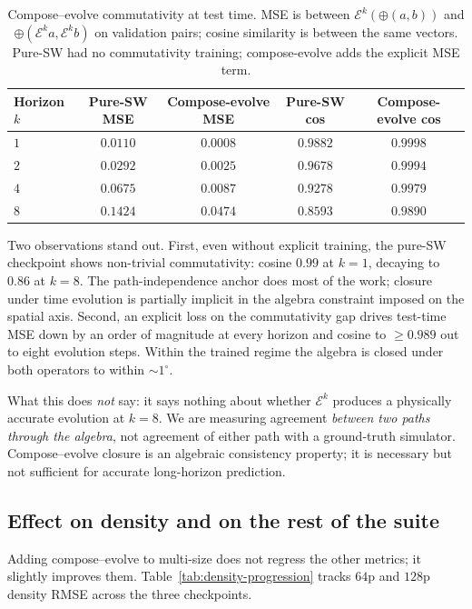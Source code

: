 \documentclass[11pt]{article}
\newcommand{\combine}{\oplus}
\newcommand{\evolve}{\mathcal{E}}
\begin{document}
\begin{table}[t]
\centering
\caption{Compose--evolve commutativity at test time. MSE is between $\evolve^k(\combine(a,b))$ and $\combine(\evolve^k a, \evolve^k b)$ on validation pairs; cosine similarity is between the same vectors. Pure-SW had no commutativity training; compose-evolve adds the explicit MSE term.}
\label{tab:compose-evolve}
\begin{tabular}{lcccc}
\toprule
Horizon $k$ & Pure-SW MSE & Compose-evolve MSE & Pure-SW cos & Compose-evolve cos \\
\midrule
$1$ & $0.0110$ & $\mathbf{0.0008}$ & $0.9882$ & $\mathbf{0.9998}$ \\
$2$ & $0.0292$ & $\mathbf{0.0025}$ & $0.9678$ & $\mathbf{0.9994}$ \\
$4$ & $0.0675$ & $\mathbf{0.0087}$ & $0.9278$ & $\mathbf{0.9979}$ \\
$8$ & $0.1424$ & $\mathbf{0.0474}$ & $0.8593$ & $\mathbf{0.9890}$ \\
\bottomrule
\end{tabular}
\end{table}

Two observations stand out. First, even without explicit training, the pure-SW checkpoint shows non-trivial commutativity: cosine $0.99$ at $k = 1$, decaying to $0.86$ at $k = 8$. The path-independence anchor does most of the work; closure under time evolution is partially implicit in the algebra constraint imposed on the spatial axis. Second, an explicit loss on the commutativity gap drives test-time MSE down by an order of magnitude at every horizon and cosine to $\ge 0.989$ out to eight evolution steps. Within the trained regime the algebra is closed under both operators to within $\sim 1^\circ$.

What this does \emph{not} say: it says nothing about whether $\evolve^k$ produces a physically accurate evolution at $k = 8$. We are measuring agreement \emph{between two paths through the algebra}, not agreement of either path with a ground-truth simulator. Compose--evolve closure is an algebraic consistency property; it is necessary but not sufficient for accurate long-horizon prediction.

\subsection{Effect on density and on the rest of the suite}

Adding compose--evolve to multi-size does not regress the other metrics; it slightly improves them. Table~\ref{tab:density-progression} tracks $64$p and $128$p density RMSE across the three checkpoints.
\end{document}
